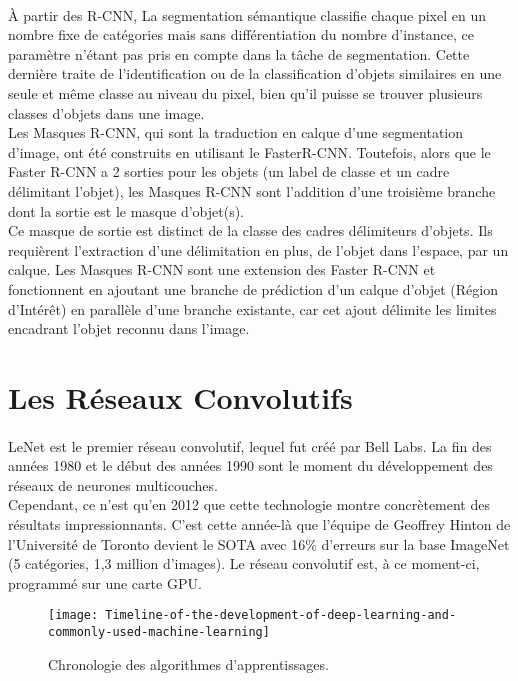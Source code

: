 \documentclass[
10pt,
a4paper, 
oneside, 
headinclude,footinclude, 
]{scrartcl}
\begin{document}
\paragraph{}À partir des \gls{R-CNN}, La segmentation sémantique classifie chaque pixel en un nombre fixe de catégories mais sans différentiation du nombre d’instance, ce paramètre n’étant pas pris en compte dans la tâche de segmentation. Cette dernière traite de l’identification ou de la classification d’objets similaires en une seule et même classe au niveau du pixel, bien qu’il puisse se trouver plusieurs classes d’objets dans une image.\\
Les Masques R-CNN, qui sont la traduction en calque d’une segmentation d’image, ont été construits en utilisant le \gls{FasterR-CNN}. Toutefois, alors que le Faster R-CNN a 2 sorties pour les objets (un label de classe et un cadre délimitant l’objet), les Masques R-CNN sont l’addition d’une troisième branche dont la sortie est le masque d’objet(s).
\\
Ce masque de sortie est distinct de la classe des cadres délimiteurs d’objets. Ils requièrent l’extraction d’une délimitation en plus, de l’objet dans l’espace, par un calque. Les Masques R-CNN sont une extension des Faster R-CNN et fonctionnent en ajoutant une branche de prédiction d’un calque d’objet (Région d’Intérêt) en parallèle d’une branche existante, car cet ajout délimite les limites encadrant l’objet reconnu dans l’image.


\section{Les Réseaux Convolutifs}

\paragraph{}LeNet est le premier réseau convolutif, lequel fut créé par Bell Labs.
La fin des années 1980 et le début des années 1990 sont le moment du développement des réseaux de neurones multicouches.\\
Cependant, ce n’est qu’en 2012 que cette technologie montre concrètement des résultats impressionnants. C’est cette année-là que l’équipe de Geoffrey Hinton de l’Université de Toronto devient le SOTA avec 16\% d’erreurs sur la base ImageNet (5 catégories, 1,3 million d’images). Le réseau convolutif est, à ce moment-ci, programmé sur une carte GPU.
\begin{figure}[htb]
\centering 
\texttt{[image: Timeline-of-the-development-of-deep-learning-and-commonly-used-machine-learning]} 
\caption[Chronologie des Algorithmes d’Apprentissages]{Chronologie des algorithmes d’apprentissages.} 
\label{fig:gallery} 
\end{figure}
\end{document}
